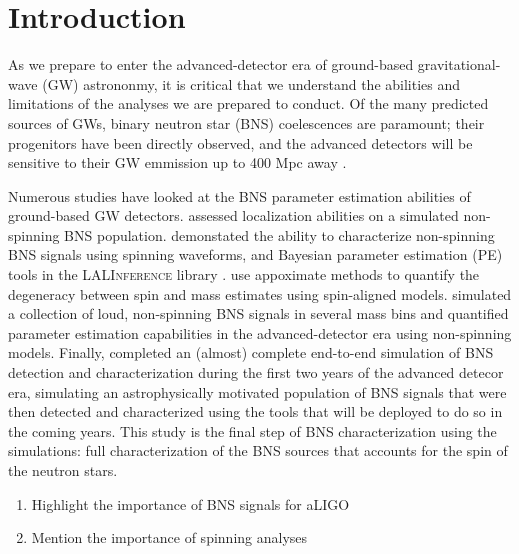 \section{Introduction}

As we prepare to enter the advanced-detector era of ground-based gravitational-wave (GW) astrononmy, it is critical that we understand the abilities and limitations of the analyses we are prepared to conduct.  Of the many predicted sources of GWs, binary neutron star (BNS) coelescences are paramount; their progenitors have been directly observed, and the advanced detectors will be sensitive to their GW emmission up to 400 Mpc away \cite{2013arXiv1304.0670L}.

Numerous studies have looked at the BNS parameter estimation abilities of ground-based GW detectors. \citet{Nissanke_2010,Nissanke_2011} assessed localization abilities on a simulated non-spinning BNS population.  \citet{Aasi_2013} demonstated the ability to characterize non-spinning BNS signals using spinning waveforms, and Bayesian parameter estimation (PE) tools in the \textsc{LALInference} library \cite{Veitch_2014}.   \citet{Hannam_2013} use appoximate methods to quantify the degeneracy between spin and mass estimates using spin-aligned models.  \citet{Rodriguez_2014} simulated a collection of loud, non-spinning BNS signals in several mass bins and quantified parameter estimation capabilities in the advanced-detector era using non-spinning models.  Finally, \citet{Singer_2014} completed an (almost) complete end-to-end simulation of BNS detection and characterization during the first two years of the advanced detecor era, simulating an astrophysically motivated population of BNS signals that were then detected and characterized using the tools that will be deployed to do so in the coming years.  This study is the final step of BNS characterization using the \citet{Singer_2014} simulations: full characterization of the BNS sources that accounts for the spin of the neutron stars.

\begin{enumerate}
\item Highlight the importance of BNS signals for aLIGO
\item Mention the importance of spinning analyses
\end{enumerate}